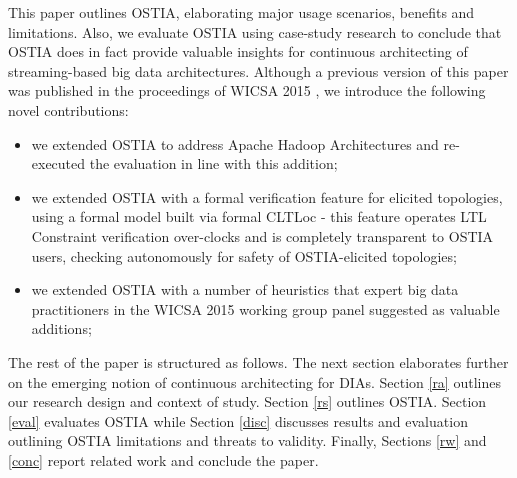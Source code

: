 This paper outlines OSTIA, elaborating major usage scenarios, benefits and limitations. Also, we evaluate OSTIA using case-study research to conclude that OSTIA does in fact provide valuable insights for continuous architecting of streaming-based big data architectures. Although a previous version of this paper was published in the proceedings of WICSA 2015 \cite{wicsabd}, we introduce the following novel contributions:
\begin{itemize}
\item we extended OSTIA to address Apache Hadoop Architectures and re-executed the evaluation in line with this addition;
\item we extended OSTIA with a formal verification feature for elicited topologies, using a formal model built via formal CLTLoc - this feature operates LTL Constraint verification  over-clocks and is completely transparent to OSTIA users, checking autonomously for  safety of OSTIA-elicited topologies;
\item we extended OSTIA with a number of heuristics that expert big data practitioners in the WICSA 2015 working group panel suggested as valuable additions;
\end{itemize}

The rest of the paper is structured as follows. The next section elaborates further on the emerging notion of continuous architecting for DIAs. Section \ref{ra} outlines our research design and context of study. Section \ref{rs} outlines OSTIA. Section \ref{eval} evaluates OSTIA while Section \ref{disc} discusses results and evaluation outlining OSTIA limitations and threats to validity. Finally, Sections \ref{rw} and \ref{conc} report related work and conclude the paper.

